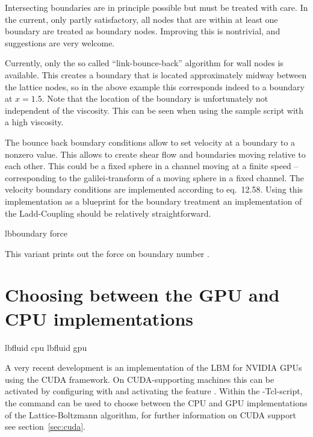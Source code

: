 Intersecting boundaries are in principle possible but must be treated
with care. 
In the current, only partly satisfactory, all nodes that are within at least
one boundary are treated as boundary nodes. Improving this is nontrivial, 
and suggestions are very welcome.

Currently, only the so called ``link-bounce-back'' algorithm for wall
nodes is available. This creates a boundary that is located
approximately midway between the lattice nodes, so in the above
example this corresponds indeed to a boundary at $x=1.5$. Note that
the location of the boundary is unfortunately not independent of the
viscosity. This can \eg be seen when using the sample script
 with a high viscosity.

The bounce back boundary conditions allow to set velocity at a boundary to a nonzero
value. This allows to create shear flow and boundaries moving relative to 
each other. This could be a fixed sphere in a channel moving at a finite speed -- 
corresponding to the galilei-transform of a moving sphere in a fixed channel.
The velocity boundary conditions are implemented according to \cite{succi01a}
eq.~12.58. Using this implementation as a blueprint for the boundary treatment 
an implementation of the Ladd-Coupling should be relatively straightforward.

\begin{essyntax}
  lbboundary force 
  \begin{features}
  \end{features}
\end{essyntax}
This variant prints out the force on boundary number .

\section{Choosing between the GPU and CPU implementations}
\begin{essyntax}
   lbfluid cpu
   lbfluid gpu
  \begin{features}
  \end{features}
\end{essyntax}

A very recent development is an implementation of the LBM for NVIDIA
GPUs using the CUDA framework.  On CUDA-supporting machines this can
be activated by configuring with  and activating the feature .
Within the \es-Tcl-script, the  command can be used to
choose between the CPU and GPU implementations of the
Lattice-Boltzmann algorithm, for further information on CUDA support
see section~\ref{sec:cuda}.

